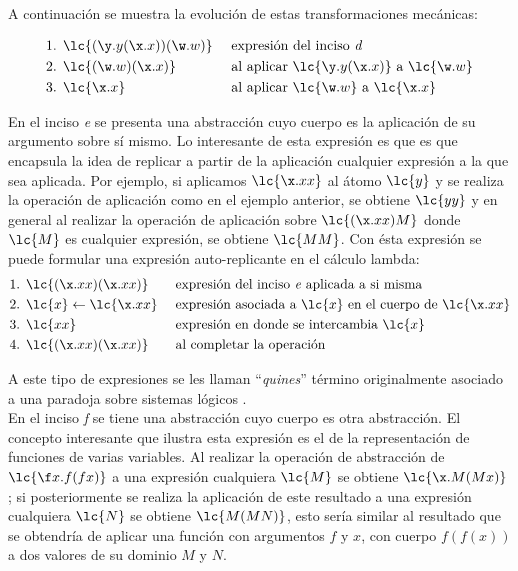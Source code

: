 A continuación se muestra la evolución de estas transformaciones mecánicas:

\begin{align*} 
  \text{1. } &\lc{(\y.y(\x.x))(\w.w)} & &\text{ expresión del inciso \emph{d}}\\ 
  \text{2. } &\lc{(\w.w)(\x.x)} & &\text{ al aplicar } \lc{\y.y(\x.x)} \text{ a } \lc{\w.w}\\ 
  \text{3. } &\lc{\x.x} & &\text{ al aplicar } \lc{\w.w} \text{ a } \lc{\x.x}
\end{align*}

En el inciso \emph{e} se presenta una abstracción cuyo cuerpo es la aplicación
de su argumento sobre sí mismo. Lo interesante de esta expresión es que
es que encapsula la idea de replicar a partir de la aplicación cualquier
expresión a la que sea aplicada. Por ejemplo, si aplicamos \(\lc{\x.x x}\) al
átomo \(\lc{y}\) y se realiza la operación de aplicación como en el ejemplo
anterior, se obtiene \(\lc{y y}\) y en general al realizar la operación de
aplicación sobre \(\lc{(\x.x x)M}\) donde \(\lc{M}\) es cualquier expresión, se
obtiene \(\lc{M M}\). Con ésta expresión se puede formular una expresión
auto-replicante en el cálculo lambda: \\

\begin{align*} 
  \text{1. } &\lc{(\x.x x)(\x.x x)} & &\text{ expresión del inciso \emph{e} aplicada a si misma}\\
  \text{2. } &\lc{x} \leftarrow \lc{\x.x x} & &\text{ expresión asociada a } \lc{x} \text{ en el cuerpo de } \lc{\x.x x}\\ 
  \text{3. } &\lc{x x} & &\text{ expresión en donde se intercambia } \lc{x}\\
  \text{4. } &\lc{(\x.x x)(\x.x x)} & &\text{ al completar la operación}
\end{align*}

A este tipo de expresiones se les llaman ``\emph{quines}'' \cite{Hofstadter:GEB}
término originalmente asociado a una paradoja sobre sistemas lógicos
\cite{Quine:Paradox}. \\

En el inciso \emph{f} se tiene una abstracción cuyo cuerpo es otra abstracción.
El concepto interesante que ilustra esta expresión es el de la representación de
funciones de varias variables. Al realizar la operación de abstracción de
\(\lc{\f x.f(f x)}\) a una expresión cualquiera \(\lc{M}\) se obtiene
\(\lc{\x.M(M x)}\); si posteriormente se realiza la aplicación de este resultado
a una expresión cualquiera \(\lc{N}\) se obtiene \(\lc{M(M N)}\), esto sería
similar al resultado que se obtendría de aplicar una función con argumentos
\(f\) y \(x\), con cuerpo \(f(f(x))\) a dos valores de su dominio \(M\) y \(N\).
\\

